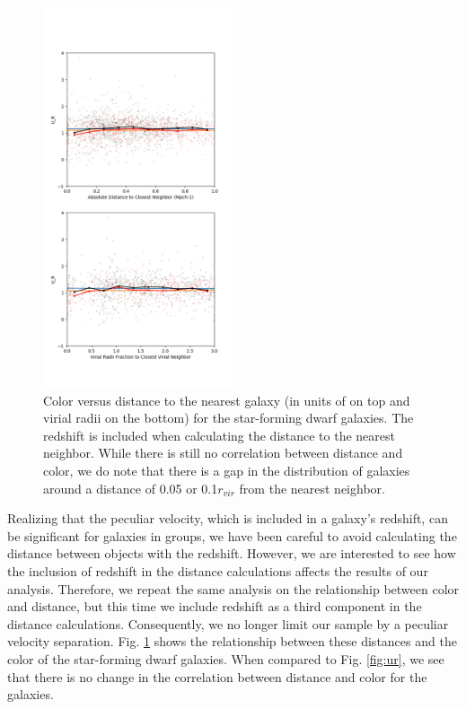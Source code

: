 \begin{figure}
    \includegraphics[width=0.5\textwidth]{Images/smallScaleEnvironment/dwarf_ur_xyz}
    \caption[Color versus distance calculated with redshift]{Color versus 
    distance to the nearest galaxy (in units of \hMpc on top and virial radii on 
    the bottom) for the star-forming dwarf galaxies.  The redshift is included 
    when calculating the distance to the nearest neighbor.  While there is still 
    no correlation between distance and color, we do note that there is a gap in 
    the distribution of galaxies around a distance of 0.05 \hMpc or 0.1$r_{vir}$ 
    from the nearest neighbor.}
    \label{fig:ur_xyz}
\end{figure}

Realizing that the peculiar velocity, which is included in a galaxy's redshift, 
can be significant for galaxies in groups, we have been careful to avoid 
calculating the distance between objects with the redshift.  However, we are 
interested to see how the inclusion of redshift in the distance calculations 
affects the results of our analysis.  Therefore, we repeat the same analysis on 
the relationship between color and distance, but this time we include redshift 
as a third component in the distance calculations.  Consequently, we no longer 
limit our sample by a peculiar velocity separation.  Fig. \ref{fig:ur_xyz} shows 
the relationship between these distances and the color of the star-forming dwarf 
galaxies.  When compared to Fig. \ref{fig:ur}, we see that there is no change in 
the correlation between distance and color for the galaxies.  

